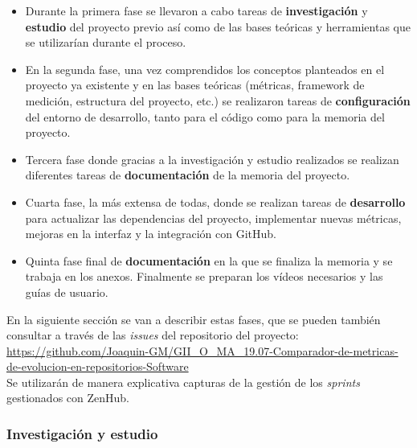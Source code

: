\begin{itemize}
	\item Durante la primera fase se llevaron a cabo tareas de \textbf{investigación} y \textbf{estudio} del proyecto previo\cite{TFGPrevio} así como de las bases teóricas y herramientas que se utilizarían durante el proceso.
	
	\item En la segunda fase, una vez comprendidos los conceptos planteados en el proyecto ya existente y en las bases teóricas (métricas, framework de medición, estructura del proyecto, etc.) se realizaron tareas de \textbf{configuración} del entorno de desarrollo, tanto para el código como para la memoria del proyecto.
	
	\item Tercera fase donde gracias a la investigación y estudio realizados se realizan diferentes tareas de \textbf{documentación} de la memoria del proyecto.
	
	\item Cuarta fase, la más extensa de todas, donde se realizan tareas de \textbf{desarrollo} para actualizar las dependencias del proyecto, implementar nuevas métricas, mejoras en la interfaz y la integración con GitHub.
	
	\item Quinta fase final de \textbf{documentación} en la que se finaliza la memoria y se trabaja en los anexos. Finalmente se preparan los vídeos necesarios y las guías de usuario.
\end{itemize}

En la siguiente sección se van a describir estas fases, que se pueden también consultar a través de las \textit{issues} del repositorio del proyecto:\\

\url{https://github.com/Joaquin-GM/GII_O_MA_19.07-Comparador-de-metricas-de-evolucion-en-repositorios-Software} \\

Se utilizarán de manera explicativa capturas de la gestión de los \textit{sprints} gestionados con ZenHub.



\subsubsection{Investigación y estudio}

